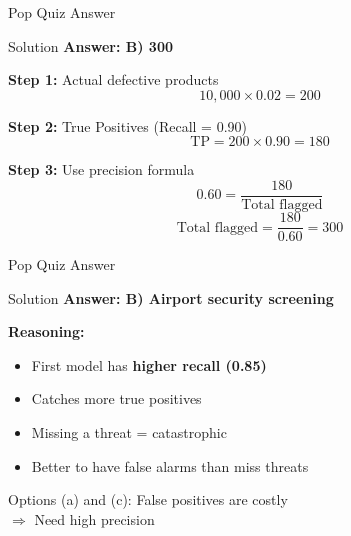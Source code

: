 \documentclass{beamer}
\begin{document}
\begin{frame}{Pop Quiz Answer}
\begin{examplebox}{Solution}
\small
\textbf{Answer: B) 300}
\end{examplebox}

\vspace{0.15cm}

\textbf{Step 1:} Actual defective products
$$10{,}000 \times 0.02 = 200$$

\textbf{Step 2:} True Positives (Recall = 0.90)
$$\text{TP} = 200 \times 0.90 = 180$$

\textbf{Step 3:} Use precision formula
$$0.60 = \frac{180}{\text{Total flagged}}$$
$$\text{Total flagged} = \frac{180}{0.60} = 300$$
\end{frame}


\begin{frame}{Pop Quiz Answer}
\begin{examplebox}{Solution}
\small
\textbf{Answer: B) Airport security screening}
\end{examplebox}

\vspace{0.15cm}

\textbf{Reasoning:}
\begin{itemize}
    \item First model has \textbf{higher recall (0.85)}
    \item Catches more true positives
    \item Missing a threat = catastrophic
    \item Better to have false alarms than miss threats
\end{itemize}

\vspace{0.15cm}

Options (a) and (c): False positives are costly \\
$\Rightarrow$ Need high precision
\end{frame}
\end{document}
